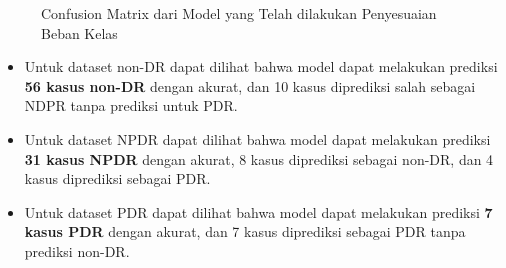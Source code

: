 \begin{figure}[t]
	\centering
	\qquad
	\qquad
	\caption{Confusion Matrix dari Model yang Telah dilakukan Penyesuaian Beban Kelas}%
	\label{fig:confRes152Class}
\end{figure}

\begin{itemize}
	\item Untuk dataset non-DR dapat dilihat bahwa model dapat melakukan prediksi \textbf{56 kasus non-DR} dengan akurat, dan 10 kasus diprediksi salah sebagai NDPR tanpa prediksi untuk PDR.
	
	\item Untuk dataset NPDR dapat dilihat bahwa model dapat melakukan prediksi \textbf{31 kasus NPDR} dengan akurat, 8 kasus diprediksi sebagai non-DR, dan 4 kasus diprediksi sebagai PDR.
	
	\item Untuk dataset PDR dapat dilihat bahwa model dapat melakukan prediksi \textbf{7 kasus PDR} dengan akurat, dan 7 kasus diprediksi sebagai PDR tanpa prediksi non-DR.
\end{itemize}

